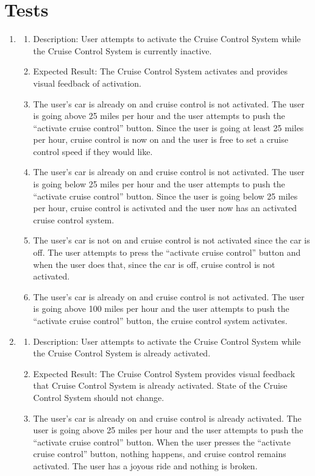 \documentclass[preprint,11pt,3p]{article}
\begin{document}
\newpage
\section{Tests}

\begin{enumerate}
	\item 
		\begin{enumerate}
		\item Description: User attempts to activate the Cruise Control System while the Cruise Control System is currently inactive.
		\item Expected Result: The Cruise Control System activates and provides visual feedback of activation.
		\item The user’s car is already on and cruise control is not activated. The user is going above 25 miles per hour and the user attempts to push the “activate cruise control” button. Since the user is going at least 25 miles per hour, cruise control is now on and the user is free to set a cruise control speed if they would like. 
		\item The user’s car is already on and cruise control is not activated. The user is going below 25 miles per hour and the user attempts to push the “activate cruise control” button. Since the user is going below 25 miles per hour, cruise control is activated and the user now has an activated cruise control system. 
		\item The user’s car is not on and cruise control is not activated since the car is off. The user attempts to press the “activate cruise control” button and when the user does that, since the car is off, cruise control is not activated. 
		\item The user’s car is already on and cruise control is not activated. The user is going above 100 miles per hour and the user attempts to push the “activate cruise control” button, the cruise control system activates. 
		\end{enumerate}
	\item 
		\begin{enumerate}
		\item Description: User attempts to activate the Cruise Control System while the Cruise Control System is already activated.
		\item Expected Result: The Cruise Control System provides visual feedback that Cruise Control System is already activated. State of the Cruise Control System should not change.
		\item The user’s car is already on and cruise control is already activated. The user is going above 25 miles per hour and the user attempts to push the “activate cruise control” button. When the user presses the “activate cruise control” button, nothing happens, and cruise control remains activated. The user has a joyous ride and nothing is broken.

\end{enumerate}
\end{enumerate}
\end{document}
